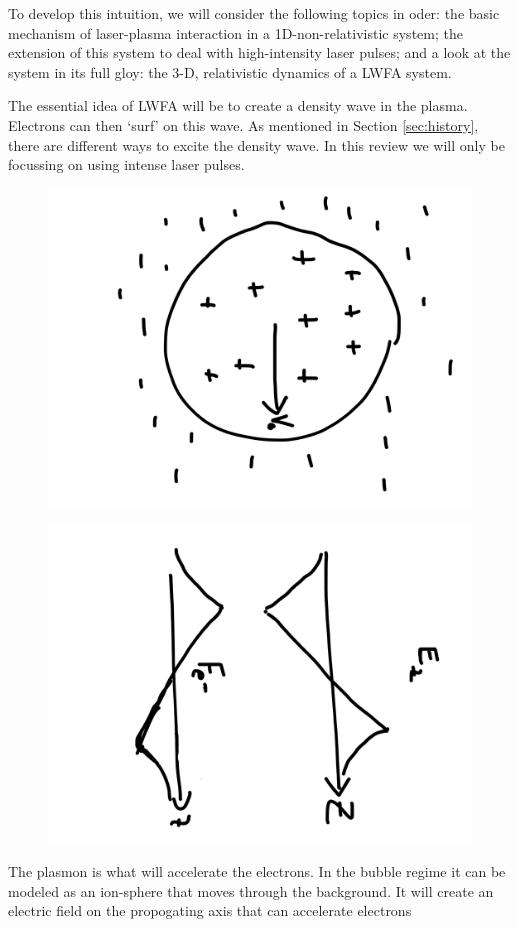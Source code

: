 \documentclass[12pt, titlepage]{article}
\begin{document}
To develop this intuition, we will consider the following topics in oder: the
basic mechanism of laser-plasma interaction in a 1D-non-relativistic system;
the extension of this system to deal with high-intensity laser pulses; and a
look at the system in its full gloy: the 3-D, relativistic dynamics of a LWFA
system.

The essential idea of LWFA will be to create a density wave in the plasma.
Electrons can then `surf' on this wave. As mentioned in Section
\ref{sec:history}, there are different ways to excite the density wave. In this
review we will only be focussing on using intense laser pulses.
\begin{marginfigure}
    \centering
    \begin{subfigure}[t]{.4\marginparwidth}
        \includegraphics[angle=90,width=\linewidth]{../figures/ioncav.png}
\end{subfigure}

	\begin{subfigure}[b]{.4\marginparwidth}
	\includegraphics[angle=90,width=\linewidth]{../figures/ioncav2.png}
	\end{subfigure}
    \caption{The plasmon is what will accelerate the electrons. In the bubble
        regime it 
    can be modeled as an ion-sphere that moves through the background. It will
    create an electric field on the propogating axis that can accelerate
electrons}


\end{marginfigure}
\end{document}
